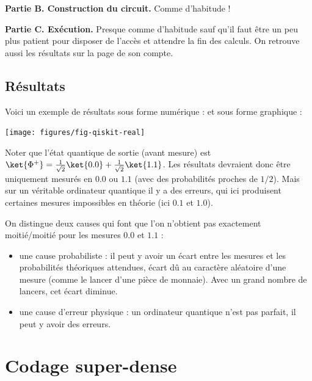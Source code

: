 \documentclass[11pt,class=report,crop=false]{standalone}
\begin{document}
\textbf{Partie B. Construction du circuit.} Comme d'habitude !

\textbf{Partie C. Exécution.} Presque comme d'habitude sauf qu'il faut être un peu plus patient pour disposer de l'accès et attendre la fin des calculs. On retrouve aussi les résultats sur la page de son compte.

\subsection{Résultats}

Voici un exemple de résultats sous forme numérique :
et sous forme graphique :
\begin{center}
\texttt{[image: figures/fig-qiskit-real]}
\end{center}

Noter que l'état quantique de sortie (avant mesure) est
$\ket{\Phi^+} =  \frac1{\sqrt2} \ket{0.0} + \frac1{\sqrt2} \ket{1.1}$.
Les résultats devraient donc être uniquement mesurés en $0.0$ ou $1.1$ (avec des probabilités proches de $1/2$). Mais sur un véritable ordinateur quantique il y a des erreurs, qui ici produisent certaines mesures impossibles en théorie (ici $0.1$ et $1.0$).

On distingue deux causes qui font que l'on n'obtient pas exactement moitié/moitié pour les mesures $0.0$ et $1.1$ :
\begin{itemize}
  \item une cause probabiliste : il peut y avoir un écart entre les mesures et les probabilités théoriques attendues, écart dû au caractère aléatoire d'une mesure (comme le lancer d'une pièce de monnaie). Avec un grand nombre de lancers, cet écart diminue.
  \item une cause d'erreur physique : un ordinateur quantique n'est pas parfait, il peut y avoir des erreurs.
\end{itemize} 



\section{Codage super-dense}


\end{document}
